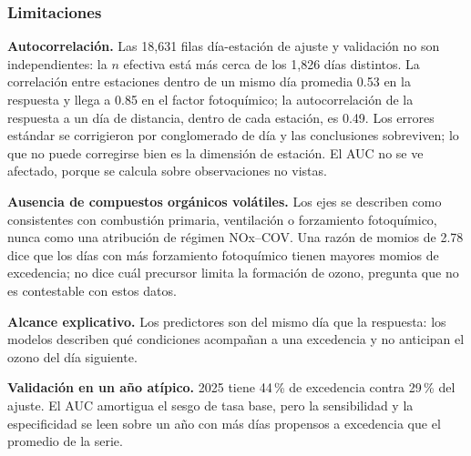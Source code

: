 \subsubsection{Limitaciones}\label{sec:limitaciones-clasificacion}

\textbf{Autocorrelación.} Las 18,631 filas día-estación de ajuste y
validación no son independientes: la $n$ efectiva está más cerca de los
1,826 días distintos. La correlación entre estaciones dentro de un mismo día
promedia 0.53 en la respuesta y llega a 0.85 en el factor fotoquímico; la
autocorrelación de la respuesta a un día de distancia, dentro de cada
estación, es 0.49. Los errores estándar se corrigieron por conglomerado de
día y las conclusiones sobreviven; lo que no puede corregirse bien es la
dimensión de estación. El AUC no se ve afectado, porque se calcula sobre
observaciones no vistas.

\textbf{Ausencia de compuestos orgánicos volátiles.} Los ejes se describen
como consistentes con combustión primaria, ventilación o forzamiento
fotoquímico, nunca como una atribución de régimen NOx--COV. Una razón de
momios de 2.78 dice que los días con más forzamiento fotoquímico tienen
mayores momios de excedencia; no dice cuál precursor limita la formación de
ozono, pregunta que no es contestable con estos datos.

\textbf{Alcance explicativo.} Los predictores son del mismo día que la
respuesta: los modelos describen qué condiciones acompañan a una excedencia
y no anticipan el ozono del día siguiente.

\textbf{Validación en un año atípico.} 2025 tiene 44\,\% de excedencia
contra 29\,\% del ajuste. El AUC amortigua el sesgo de tasa base, pero la
sensibilidad y la especificidad se leen sobre un año con más días propensos
a excedencia que el promedio de la serie.
